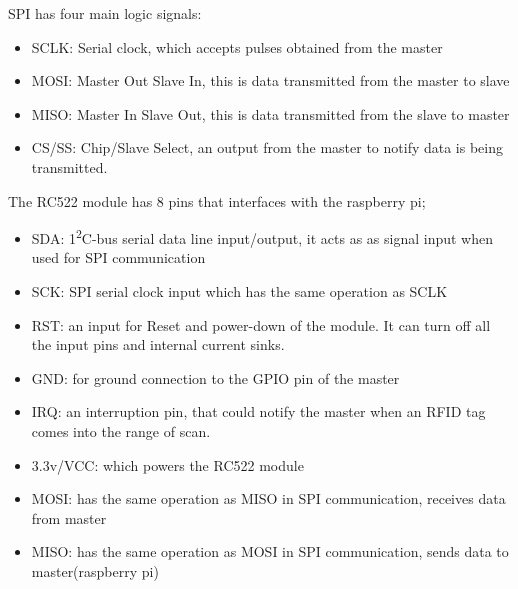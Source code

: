 SPI has four main logic signals: 
\begin{itemize}
  \item SCLK: Serial clock, which accepts pulses obtained from the master
  \item MOSI: Master Out Slave In, this is data transmitted from the master to slave
  \item MISO: Master In Slave Out, this is data transmitted from the slave to master
  \item CS/SS: Chip/Slave Select, an output from the master to notify data is being transmitted.
\end{itemize}

The RC522 module has 8 pins that interfaces with the raspberry pi;
\begin{itemize}
  \item SDA: 1\textsuperscript{2}C-bus serial data line input/output, it acts as as signal input when used for SPI communication
  \item SCK: SPI serial clock input which has the same operation as SCLK
  \item RST: an input for Reset and power-down of the module. It can turn off all the input pins and internal current sinks. 
  \item GND: for ground connection to the GPIO pin of the master
  \item IRQ: an interruption pin, that could notify the master when an RFID tag comes into the range of scan.
  \item 3.3v/VCC: which powers the RC522 module
  \item MOSI: has the same operation as MISO in SPI communication, receives data from master
  \item MISO: has the same operation as MOSI in SPI communication, sends data to master(raspberry pi)
\end{itemize}

